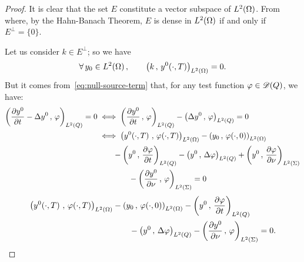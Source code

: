\begin{proof}%
    It is clear that the set $E$ constitute a vector subspace of
    $L^{2}\!\left({\Omega}\right)$. From where, by the Hahn-Banach Theorem, $E$ is dense
    in $L^{2}\!\left({\Omega}\right)$ if and only if $E^{\perp} = \{0\}$.

    Let us consider $k\in E^{\perp}$; so we have
    \begin{equation*}\label{eq:proof-controllability-26}
        \forall\,y_{0}\in L^{2}\!\left({\Omega}\right),\qquad
        {\left({ k\,,\,y^{0}\!\left({\cdot,T}\right) }\right)}_{L^{2}\left({\Omega}\right)} = 0.
    \end{equation*}
    But it comes from~\eqref{eq:null-source-term} that, for any test
    function $\varphi\in\mathscr{D}(Q)$, we have:
    \begin{equation*}
        \begin{split}
            \scalaireq{\primetemps{y^{0}} - \Delta y^{0}}{\vphi} = 0 &\iff
            \scalaireq{\primetemps{y^{0}}}{\vphi} - \scalaireq{\Delta
            y^{0}}{\vphi} = 0\\
            &\iff \scalaireohm{%
                y^{0}\!\left({\cdot,T}\right)
            }{%
                \vphi\!\left({\cdot,T}\right)
            } - \scalaireohm{%
                y_{0}
            }{%
                \vphi\!\left({\cdot,0}\right)
            }\\
            &\qquad - \scalaireq{y^{0}}{\primetemps{\vphi}} - \scalaireq{y^{0}
            }{%
                \Delta \vphi
            } + \scalaires{y^{0}
            }{\deriveenormale{\vphi}
            }\\
            &\qquad\qquad - \scalaires{\deriveenormale{y^{0}}}{\vphi} = 0
        \end{split}
    \end{equation*}
    \ie{}
    \begin{equation}\label{eq:controllability-proof-30}
        \begin{split}
            \scalaireohm{%
                y^{0}\!\left({\cdot,T}\right)
            }{%
                \vphi\!\left({\cdot,T}\right)
            } &- \scalaireohm{%
                y_{0}
            }{%
                \vphi\!\left({\cdot,0}\right)
            } - \scalaireq{%
                y^{0}
            }{%
                \primetemps{\vphi}
            }\\
            &\qquad - \scalaireq{%
                y^{0}
            }{%
                \Delta\vphi
            } - \scalaires{%
                \deriveenormale{y^{0}}
            }{\vphi} = 0.
        \end{split}

\end{equation}
\end{proof}
